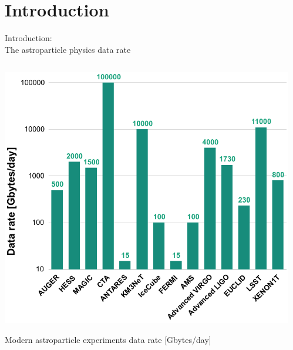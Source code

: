 \section{Introduction}

\begin{frame}
\titlepage
\end{frame}

\begin{frame}{Introduction: \\The astroparticle physics data rate}
\small
\vspace{-2em}
\begin{columns}
  \begin{column}[t]{0.45\textwidth}
    \begin{center}
      \includegraphics[width=1\textwidth]{pics/appec_base4.pdf}
    \end{center}
    \vspace{-2\parsep}
    \small Modern astroparticle experiments data rate [Gbytes/day]\footnotemark[1] %
  \end{column}
  \hfill
  \begin{column}[t]{0.53\textwidth}

\end{column}
\end{columns}
\end{frame}
